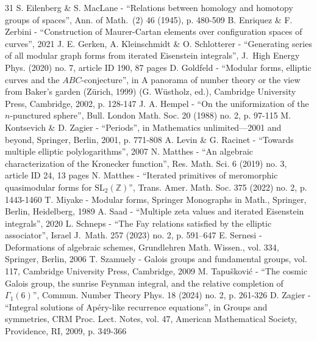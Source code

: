 \begin{thebibliography}{31}
S. Eilenberg \& S. MacLane - “Relations between homology and homotopy groups of spaces”, Ann. of Math. (2) 46 (1945), p. 480-509
B. Enriquez \& F. Zerbini - “Construction of Maurer-Cartan elements over configuration spaces of curves”, 2021
J. E. Gerken, A. Kleinschmidt \& O. Schlotterer - “Generating series of all modular graph forms from iterated Eisenstein integrals”, J. High Energy Phys. (2020) no. 7, article ID 190, 87 pages
D. Goldfeld - “Modular forms, elliptic curves and the $ABC$-conjecture”, in A panorama of number theory or the view from Baker’s garden (Zürich, 1999) (G. Wüstholz, ed.), Cambridge University Press, Cambridge, 2002, p. 128-147
J. A. Hempel - “On the uniformization of the $n$-punctured sphere”, Bull. London Math. Soc. 20 (1988) no. 2, p. 97-115
M. Kontsevich \& D. Zagier - “Periods”, in Mathematics unlimited—2001 and beyond, Springer, Berlin, 2001, p. 771-808
A. Levin \& G. Racinet - “Towards multiple elliptic polylogarithms”, 2007
N. Matthes - “An algebraic characterization of the Kronecker function”, Res. Math. Sci. 6 (2019) no. 3, article ID 24, 13 pages
N. Matthes - “Iterated primitives of meromorphic quasimodular forms for $\mathrm{SL}_2(\mathbb{Z})$”, Trans. Amer. Math. Soc. 375 (2022) no. 2, p. 1443-1460
T. Miyake - Modular forms, Springer Monographs in Math., Springer, Berlin, Heidelberg, 1989
A. Saad - “Multiple zeta values and iterated Eisenstein integrals”, 2020
L. Schneps - “The Fay relations satisfied by the elliptic associator”, Israel J. Math. 257 (2023) no. 2, p. 591–647
E. Sernesi - Deformations of algebraic schemes, Grundlehren Math. Wissen., vol. 334, Springer, Berlin, 2006
T. Szamuely - Galois groups and fundamental groups, vol. 117, Cambridge University Press, Cambridge, 2009
M. Tapušković - “The cosmic Galois group, the sunrise Feynman integral, and the relative completion of $\Gamma _1(6)$”, Commun. Number Theory Phys. 18 (2024) no. 2, p. 261-326
D. Zagier - “Integral solutions of Apéry-like recurrence equations”, in Groups and symmetries, CRM Proc. Lect. Notes, vol. 47, American Mathematical Society, Providence, RI, 2009, p. 349-366
\end{thebibliography}
